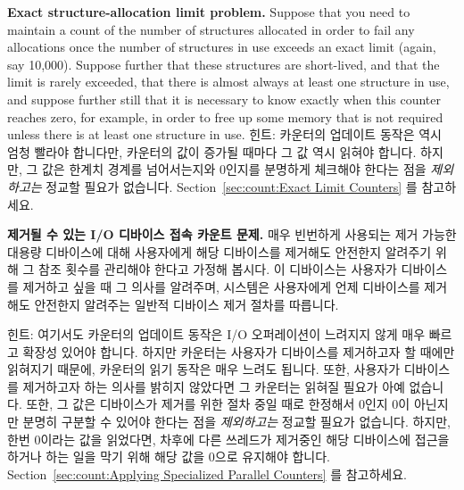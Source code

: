 \begin{enumerate}
	{ \bfseries Exact structure-allocation limit problem. }
	Suppose that you need to maintain a count of the number of
	structures allocated in order to fail any allocations
	once the number of structures in use exceeds an exact limit
	(again, say 10,000).
	Suppose further that these structures are short-lived,
	and that the limit is rarely exceeded, that there is almost
	always at least one structure in use, and suppose further
	still that it is necessary to know exactly when this counter reaches
	zero, for example, in order to free up some memory
	that is not required unless there is at least one structure
	in use.
	\fi
\QuickA{}
	힌트: 카운터의 업데이트 동작은 역시 엄청 빨라야 합니다만, 카운터의 값이
	증가될 때마다 그 값 역시 읽혀야 합니다.
	하지만, 그 값은 한계치 경계를 넘어서는지와 0인지를 분명하게 체크해야
	한다는 점을 \emph{제외하고는} 정교할 필요가 없습니다.
	Section~\ref{sec:count:Exact Limit Counters} 를 참고하세요.

\QuickQ{}
	{ \bfseries 제거될 수 있는 I/O 디바이스 접속 카운트 문제. }
	매우 빈번하게 사용되는 제거 가능한 대용량 디바이스에 대해 사용자에게
	해당 디바이스를 제거해도 안전한지 알려주기 위해 그 참조 횟수를 관리해야
	한다고 가정해 봅시다.
	이 디바이스는 사용자가 디바이스를 제거하고 싶을 때 그 의사를 알려주며,
	시스템은 사용자에게 언제 디바이스를 제거해도 안전한지 알려주는 일반적
	디바이스 제거 절차를 따릅니다.

\QuickA{}
	힌트: 여기서도 카운터의 업데이트 동작은 I/O 오퍼레이션이 느려지지 않게
	매우 빠르고 확장성 있어야 합니다. 하지만 카운터는 사용자가 디바이스를
	제거하고자 할 때에만 읽혀지기 때문에, 카운터의 읽기 동작은 매우 느려도
	됩니다.
	또한, 사용자가 디바이스를 제거하고자 하는 의사를 밝히지 않았다면 그
	카운터는 읽혀질 필요가 아예 없습니다.
	또한, 그 값은 디바이스가 제거를 위한 절차 중일 때로 한정해서 0인지 0이
	아닌지만 분명히 구분할 수 있어야 한다는 점을 \emph{제외하고는} 정교할
	필요가 없습니다.
	하지만, 한번 0이라는 값을 읽었다면, 차후에 다른 쓰레드가 제거중인 해당
	디바이스에 접근을 하거나 하는 일을 막기 위해 해당 값을 0으로 유지해야
	합니다.
	Section~\ref{sec:count:Applying Specialized Parallel Counters} 를
	참고하세요.
	\iffalse


\end{enumerate}
